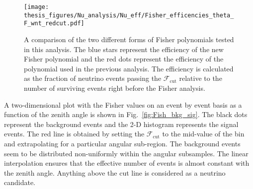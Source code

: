 \begin{figure}[h!]
  \centering
  \texttt{[image: thesis\_figures/Nu\_analysis/Nu\_eff/Fisher\_efficencies\_theta\_F\_wnt\_redcut.pdf]}
  \caption{A comparison of the two different forms of Fisher polynomials tested in this analysis. The blue stars represent the efficiency of the new Fisher polynomial and the red dots represent the efficiency of the polynomial used in the previous analysis. The efficiency is calculated as the fraction of neutrino events passing the $\mathcal{F}_{\text{cut}}$ relative to the number of surviving events right before the Fisher analysis.}
  \label{fig:Fishpol_v_theta}
\end{figure}

A two-dimensional plot with the Fisher values on an event by event basis as a function of the zenith angle is shown in Fig.~\ref{fig:Fish_bkg_sig}. The black dots represent the background events and the 2-D histogram represents the signal events. The red line is obtained by setting the $\mathcal{F}_{\text{cut}}$ to the mid-value of the bin and extrapolating for a particular angular sub-region. The background events seem to be distributed non-uniformly within the angular subsamples. The linear interpolation ensures that the effective number of events is almost constant with the zenith angle. Anything above the cut line is considered as a neutrino candidate. 

